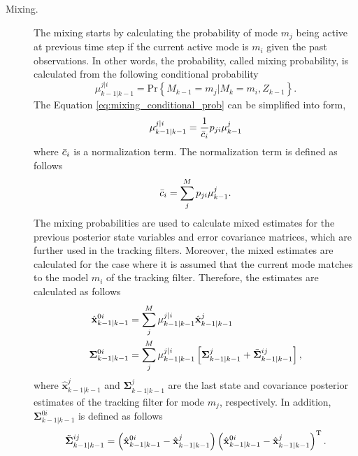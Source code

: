 \documentclass[english, 12pt, a4paper, elec, utf8, a-1b, online]{aaltothesis}
\renewcommand{\vec}[1]{\mathbf{#1}}
\renewcommand{\Pr}[1]{\text{Pr}\left\{ #1 \right\}}
\newcommand{\transpose}[1]{#1^\text{T}}
\newcommand{\lastmxprobs}{\mu^{j|i}_{k-1|k-1}}
\newcommand{\mxnorm}{ \Bar{c}_i }
\newcommand{\xmxinit}{\hat{\vec{x}}^{0i}_{k-1|k-1}}
\newcommand{\ecovmxinit}{\bm{\Sigma}^{0i}_{k-1|k-1}}
\newcommand{\modexlast}{\hat{\vec{x}}^{j}_{k-1|k-1}}
\newcommand{\modecovlast}{\bm{\Sigma}^j_{k-1|k-1}}
\newcommand{\modemxcovlast}{\Tilde{\bm{\Sigma}}^{ij}_{k-1|k-1}}
\begin{document}
\begin{description}
\item[Mixing.]

The mixing starts by calculating the probability of mode $m_j$ being active at previous time step if the current active mode is $m_i$ given the past observations.
In other words, the probability, called mixing probability, is calculated from the following conditional probability
\begin{equation}\label{eq:mixing_conditional_prob}
    \lastmxprobs = \Pr{M_{k-1}=m_j|M_{k}=m_i, Z_{k-1}}.
\end{equation}
The Equation \eqref{eq:mixing_conditional_prob} can be simplified into form,
\begin{equation}
    \lastmxprobs = \frac{1}{\mxnorm} p_{ji} \mu^j_{k-1} \label{eq:imm_mx_probs}
\end{equation}
where $\mxnorm$ is a normalization term. 
The normalization term is defined as follows
\begin{equation}
    \mxnorm = \sum_j^M p_{ji} \mu^j_{k-1}. \label{eq:imm_mx_normalization}
\end{equation}
The mixing probabilities are used to calculate mixed estimates for the previous posterior state variables and error covariance matrices, which are further used in the tracking filters.
Moreover, the mixed estimates are calculated for the case where it is assumed that the current mode matches to the model $m_i$ of the tracking filter.
Therefore, the estimates are calculated as follows
\begin{subequations}
\begin{align}
    \xmxinit &= \sum_j^M \lastmxprobs \modexlast \label{eq:imm_mx_init_x}\\
    \ecovmxinit &= \sum_j^M \lastmxprobs \left[ \modecovlast + \modemxcovlast \right], \label{eq:imm_mx_init_P}
\end{align}
\end{subequations}
where $\modexlast$ and $\modecovlast$ are the last state and covariance posterior estimates of the tracking filter for mode $m_j$, respectively. 
In addition, $\ecovmxinit$ is defined as follows
\begin{equation}
    \modemxcovlast = 
    \left( \xmxinit - \modexlast  \right) 
    \transpose{\left( \xmxinit - \modexlast   \right)}.\label{eq:imm_mx_init_Ptilde}
\end{equation}


\end{description}
\end{document}
